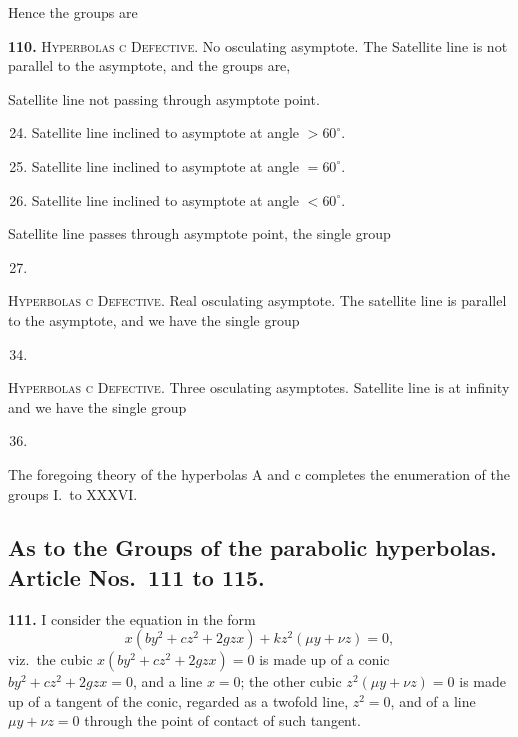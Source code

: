 \documentclass[11pt,a4paper]{article}
\theoremstyle{plain}
\begin{document}
Hence the groups are

\noindent\textbf{110.} \textsc{Hyperbolas c Defective.} No osculating asymptote. The Satellite line is not parallel to the asymptote, and the groups are,

Satellite line not passing through asymptote point.
\begin{enumerate}[label=\textsc{\Roman*.},nosep]
\setcounter{enumi}{23}
\item Satellite line inclined to asymptote at angle $> 60^{\circ}$.
\item Satellite line inclined to asymptote at angle $= 60^{\circ}$.
\item Satellite line inclined to asymptote at angle $< 60^{\circ}$.
\end{enumerate}

Satellite line passes through asymptote point, the single group
\begin{enumerate}[label=\textsc{\Roman*.},nosep]
\setcounter{enumi}{26}
\item
\end{enumerate}

\textsc{Hyperbolas c Defective.} Real osculating asymptote. The satellite line is parallel to the asymptote, and we have the single group
\begin{enumerate}[label=\textsc{\Roman*.},nosep]
\setcounter{enumi}{33}
\item
\end{enumerate}

\textsc{Hyperbolas c Defective.} Three osculating asymptotes. Satellite line is at infinity and we have the single group
\begin{enumerate}[label=\textsc{\Roman*.},nosep]
\setcounter{enumi}{35}
\item
\end{enumerate}

The foregoing theory of the hyperbolas A and c completes the enumeration of the groups I.~to XXXVI.

\subsection*{As to the Groups of the parabolic hyperbolas. Article Nos.\ 111 to 115.}

\noindent\textbf{111.} I consider the equation in the form
\[
x(by^2 + cz^2 + 2gzx) + kz^2(\mu y + \nu z) = 0,
\]
viz.\ the cubic $x(by^2 + cz^2 + 2gzx) = 0$ is made up of a conic $by^2 + cz^2 + 2gzx = 0$, and a line $x = 0$; the other cubic $z^2(\mu y + \nu z)=0$ is made up of a tangent of the conic, regarded as a twofold line, $z^2 = 0$, and of a line $\mu y + \nu z = 0$ through the point of contact of such tangent.
\end{document}
